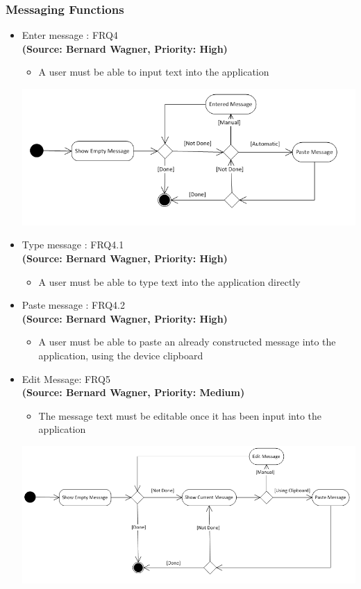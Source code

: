 \subsubsection{Messaging Functions}
\begin{itemize}
\item{Enter message : FRQ4}\\%
\textbf{(Source: Bernard Wagner, Priority: High)}
\begin{itemize}
\item A user must be able to input text into the application
\end{itemize}
 \includegraphics[width=13cm]{diagrams/StateDiagrams/EnterMessageState.png}
\item{Type message : FRQ4.1}\\
\textbf{(Source: Bernard Wagner, Priority: High)}
\begin{itemize}
\item A user must be able to type text into the application directly
\end{itemize}
\item{Paste message : FRQ4.2}\\
\textbf{(Source: Bernard Wagner, Priority: High)}
\begin{itemize}
\item A user must be able to paste an already constructed message into the application, using the device clipboard
\end{itemize}
\item{Edit Message: FRQ5}\\
\textbf{(Source: Bernard Wagner, Priority: Medium)}
\begin{itemize}
\item The message text must be editable once it has been input into the application
\end{itemize}
 \includegraphics[width=13cm]{diagrams/StateDiagrams/EditMessageState.png}

\end{itemize}
